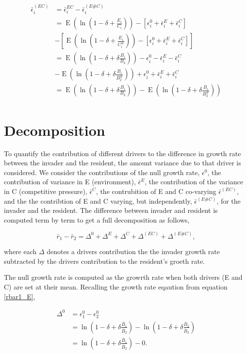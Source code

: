 \documentclass[letterpaper,11pt]{article}
\DeclareMathOperator{\EX}{E}%
\begin{document}
\begin{align}
\bar \epsilon_i^{(EC)} &=\bar \epsilon_i^{EC}-\bar \epsilon_i^{(E\#C)}\\
&= \EX(\ln(1-\delta + \frac{E_i}{C_i}))-[\epsilon_i^0 +\bar \epsilon_i^E + \bar \epsilon_i^C]\\
&- [\EX(\ln(1-\delta + \frac{E_i}{C_i^{\#}})) -[\epsilon_i^0 +\bar \epsilon_i^E + \bar \epsilon_i^C]] \\
&= \EX(\ln(1-\delta + \delta \frac{B_i}{B_2}))-\epsilon_i^0 -\bar \epsilon_i^E - \bar \epsilon_i^C\\
&- \EX(\ln(1-\delta + \delta \frac{B_i}{B_2^{\#}})) +\epsilon_i^0 +\bar \epsilon_i^E + \bar \epsilon_i^C \\
&= \EX(\ln(1-\delta + \delta \frac{B_i}{B_2}))-\EX(\ln(1-\delta + \delta \frac{B_i}{B_2^{\#}}))\\
\end{align}


\section{Decomposition}

To quantify the contribution of different drivers to the difference in growth rate between the invader and the resident, the amount variance due to that driver is considered. We consider the contributions of the null growth rate, $\epsilon^0$, the contribution of variance in E (environment), $\bar \epsilon^E$, the contribution of the variance in C (competitive pressure), $\bar \epsilon^C$, the contrubition of E and C co-varying $\bar \epsilon^{(EC)}$, and the the contribtion of E and C varying, but independently, $\bar \epsilon^{(E\#C)}$, for the invader and the resident. The difference between invader and resident is computed term by term to get a full decomposition as follows,

\begin{equation}
\bar r_1-\bar r_2 = \Delta^0+\Delta^E+\Delta^C+\Delta^{(EC)}+\Delta^{(E\#C)}, \label{IGR}
\end{equation}

\noindent where each $\Delta$ denotes a drivers contribution the the invader growth rate subtracted by the drivers contribution to the resident's groeth rate.

The null growth rate is computed as the growrth rate when both drivers (E and C) are set at their mean. Recalling the growth rate eqaution from equation \ref{rbar1_E},

\begin{align}
\Delta^0 &= \epsilon_1^0 - \epsilon_2^0\\
&=\ln(1-\delta + \delta \frac{\bar B_1}{\bar B_2}) - \ln(1-\delta + \delta \frac{\bar B_2}{\bar B_2})\\
&=\ln(1-\delta + \delta \frac{\bar B_1}{\bar B_2}) - 0. \\
\end{align}
\end{document}
